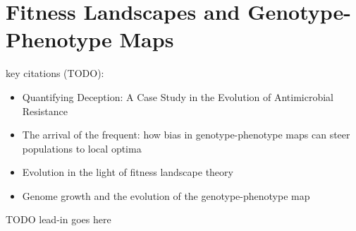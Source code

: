 \section{Fitness Landscapes and Genotype-Phenotype Maps}
\label{sec:fitness-landscape}

key citations (TODO):
\begin{itemize}
  \item Quantifying Deception: A Case Study in the Evolution of Antimicrobial Resistance \citep{eppstein2016quantifying}
  \item The arrival of the frequent: how bias in genotype-phenotype maps can steer populations to local optima \citep{schaper2014theb}
  \item Evolution in the light of fitness landscape theory \citep{fragata2019evolution}
  \item Genome growth and the evolution of the genotype-phenotype map \citep{altenberg1995genome}
\end{itemize}

TODO lead-in goes here

